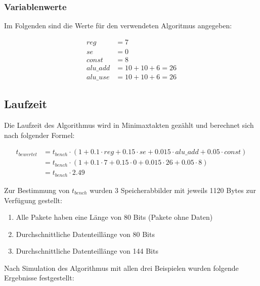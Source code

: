 \subsubsection{Variablenwerte}
\label{subsubsection:Dokumentation-BenchmarkBewertung-Berechnung-Variablen-Variablenwerte}


Im Folgenden sind die Werte für den verwendeten Algoritmus angegeben:

\begin{align*}
    reg      &= 7 \\
    se       &= 0 \\
    const    &= 8 \\
    alu\_add &= 10 + 10 + 6 = 26 \\
    alu\_use &= 10 + 10 + 6 = 26
\end{align*}

\subsection{Laufzeit}
\label{subsection:Dokumentation-BenchmarkBewertung-Berechnung-Laufzeit}

Die Laufzeit des Algorithmus wird in Minimaxtakten gezählt und berechnet sich nach folgender Formel:

\begin{align*}
    t_{bewertet} &= t_{bench} \cdot (1 + 0.1 \cdot reg + 0.15 \cdot se + 0.015 \cdot alu\_add + 0.05 \cdot const) \\
                 &= t_{bench} \cdot (1 + 0.1 \cdot 7 + 0.15 \cdot 0 + 0.015 \cdot 26 + 0.05 \cdot 8) \\
                 &= t_{bench} \cdot 2.49
\end{align*}

Zur Bestimmung von $t_{bench}$ wurden 3 Speicherabbilder mit jeweils 1120 Bytes zur Verfügung gestellt:

\begin{enumerate}
    \item Alle Pakete haben eine Länge von 80 Bits (Pakete ohne Daten)
    \item Durchschnittliche Datenteillänge von 80 Bits
    \item Durchschnittliche Datenteillänge von 144 Bits
\end{enumerate}

Nach Simulation des Algorithmus mit allen drei Beispielen wurden folgende Ergebnisse festgestellt: 

